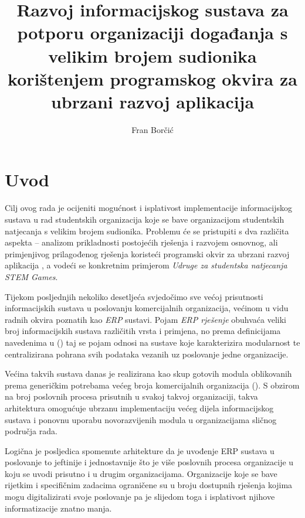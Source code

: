 \documentclass[times, utf8, diplomski]{fer}
\begin{document}

\title{Razvoj informacijskog sustava za potporu organizaciji događanja s velikim
brojem sudionika korištenjem programskog okvira za ubrzani razvoj aplikacija}

\author{Fran Borčić}

\maketitle




\tableofcontents

\chapter{Uvod}

Cilj ovog rada je ocijeniti mogućnost i isplativost implementacije
informacijskog sustava u rad studentskih organizacija koje se bave organizacijom
studentskih natjecanja s velikim brojem sudionika. Problemu će se pristupiti s
dva različita aspekta -- analizom prikladnosti postojećih rješenja i razvojem
osnovnog, ali primjenjivog prilagođenog rješenja koristeći programski okvir za
ubrzani razvoj aplikacija , a vodeći se konkretnim primjerom
\emph{Udruge za studentska natjecanja STEM Games}.

Tijekom posljednjih nekoliko desetljeća svjedočimo sve većoj prisutnosti
informacijskih sustava u poslovanju komercijalnih organizacija, većinom u vidu
radnih okvira poznatih kao \emph{ERP} sustavi. Pojam \emph{ERP rješenje}
 obuhvaća veliki broj informacijskih sustava
različitih vrsta i primjena, no prema definicijama navedenima u
(\cite{evolutionerp})
taj se pojam odnosi na sustave koje karakterizira modularnost te centralizirana
pohrana svih podataka vezanih uz poslovanje jedne organizacije.

Većina takvih sustava danas je realizirana kao skup gotovih modula oblikovanih
prema generičkim potrebama većeg broja komercijalnih organizacija
(\cite{bradford2014modern}). S obzirom na broj poslovnih procesa prisutnih u
svakoj takvoj organizaciji, takva arhitektura omogućuje ubrzanu implementaciju
većeg dijela informacijskog sustava i ponovnu uporabu novorazvijenih modula u
organizacijama sličnog područja rada.

Logična je posljedica spomenute arhitekture da je uvođenje ERP sustava u
poslovanje to jeftinije i jednostavnije što je više poslovnih procesa organizacije
u koju se uvodi prisutno i u drugim organizacijama. Organizacije koje se bave
rijetkim i specifičnim zadacima ograničene su u broju dostupnih rješenja kojima
mogu digitalizirati svoje poslovanje pa je slijedom toga i isplativost njihove
informatizacije znatno manja.
\end{document}
